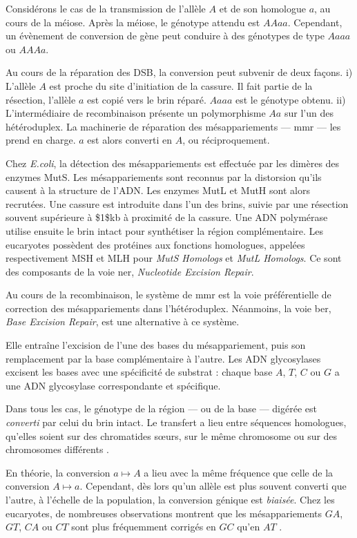 \documentclass[11pt, oneside]{scrartcl}
\begin{document}
Considérons le cas de la transmission de l'allèle \(A\) et de son homologue \(a\),
au cours de la méiose. Après la méiose, le génotype attendu est \(AAaa\).
Cependant, un évènement de conversion de gène peut conduire à des génotypes de
type \(Aaaa\) ou \(AAAa\). 

Au cours de la réparation des DSB, la conversion peut subvenir de deux façons.
i) L'allèle \(A\) est proche du site d'initiation de la cassure. Il fait partie de
la résection, l'allèle \(a\) est copié vers le brin réparé. \(Aaaa\) est le génotype
obtenu. ii) L'intermédiaire de recombinaison présente un polymorphisme \(Aa\) sur
l'un des hétéroduplex. La machinerie de réparation des mésappariements ---
\ac{mmr} --- les prend en charge. \(a\) est alors converti en \(A\), ou
réciproquement.

Chez \emph{E.coli}, la détection des mésappariements est effectuée par les dimères
des enzymes MutS. Les mésappariements sont reconnus par la distorsion qu'ils
causent à la structure de l'ADN. Les enzymes MutL et MutH sont alors recrutées.
Une cassure est introduite dans l'un des brins, suivie par une résection souvent
supérieure à \$1\$kb à proximité de la cassure. Une ADN polymérase utilise ensuite
le brin intact pour synthétiser la région complémentaire. Les eucaryotes
possèdent des protéines aux fonctions homologues, appelées respectivement MSH et
MLH pour \emph{MutS Homologs} et \emph{MutL Homologs}. Ce sont des composants de la voie
\ac{ner}, \emph{Nucleotide Excision Repair}.

Au cours de la recombinaison, le système de \ac{mmr} est la voie préférentielle
de correction des mésappariements dans l'hétéroduplex. Néanmoins, la voie
\ac{ber}, \emph{Base Excision Repair}, est une alternative à ce système.

Elle entraîne l'excision de l'une des bases du mésappariement, puis son
remplacement par la base complémentaire à l'autre. Les ADN glycosylases excisent
les bases avec une spécificité de substrat : chaque base \(A\), \(T\), \(C\) ou \(G\) a
une ADN glycosylase correspondante et spécifique.

Dans tous les cas, le génotype de la région --- ou de la base --- digérée est
\emph{converti} par celui du brin intact. Le transfert a lieu entre séquences
homologues, qu'elles soient sur des chromatides sœurs, sur le même chromosome ou
sur des chromosomes différents \cite{chen_gene_2007}.

\begin{transition}

En théorie, la conversion $a \mapsto A$ a lieu avec la même fréquence que celle
de la conversion $A \mapsto a$. Cependant, dès lors qu'un allèle est plus
souvent converti que l'autre, à l'échelle de la population, la conversion
génique est {\em biaisée}. Chez les eucaryotes, de nombreuses observations montrent
que les mésappariements $GA$, $GT$, $CA$ ou $CT$ sont plus fréquemment corrigés
en $GC$ qu'en $AT$ \cite{duret_biased_2009}. 

\end{transition}
\end{document}
